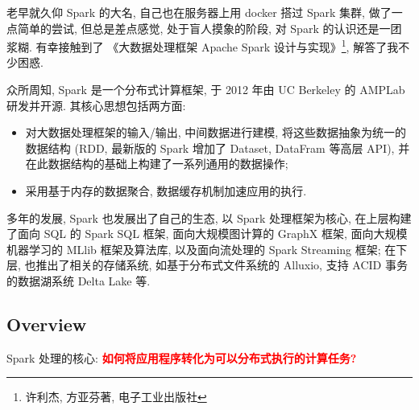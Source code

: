 老早就久仰 Spark 的大名, 自己也在服务器上用 docker 搭过 Spark 集群, 做了一点简单的尝试, 但总是差点感觉, 处于盲人摸象的阶段, 对 Spark 的认识还是一团浆糊. 有幸接触到了 《大数据处理框架 Apache Spark 设计与实现》\footnote{许利杰, 方亚芬著, 电子工业出版社}, 解答了我不少困惑. 

众所周知, Spark 是一个分布式计算框架, 于 2012 年由 UC Berkeley 的 AMPLab 研发并开源. 其核心思想包括两方面: 
\begin{itemize}
	\item 对大数据处理框架的输入/输出, 中间数据进行建模, 将这些数据抽象为统一的数据结构 (RDD, 最新版的 Spark 增加了 Dataset, DataFram 等高层 API), 并在此数据结构的基础上构建了一系列通用的数据操作;
	
	\item 采用基于内存的数据聚合, 数据缓存机制加速应用的执行.
\end{itemize}

多年的发展, Spark 也发展出了自己的生态, 以 Spark 处理框架为核心, 在上层构建了面向 SQL 的 Spark SQL 框架, 面向大规模图计算的 GraphX 框架, 面向大规模机器学习的 MLlib 框架及算法库, 以及面向流处理的 Spark Streaming 框架; 在下层,  也推出了相关的存储系统, 如基于分布式文件系统的 Alluxio, 支持 ACID 事务的数据湖系统 Delta Lake 等. 


\subsection{Overview}

Spark 处理的核心: \textcolor{red}{\textbf{如何将应用程序转化为可以分布式执行的计算任务?}}

